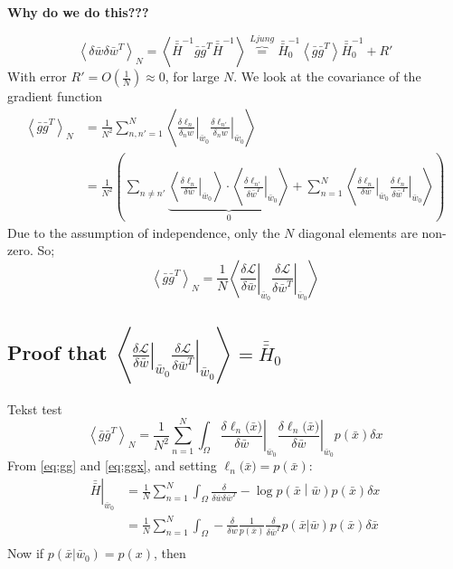 \textbf{Why do we do this???}

\begin{equation}
\left\langle \delta \bar{w} \delta \bar{w}^T \right\rangle_{N} = 
\left\langle \bar{\bar{H}}^{-1} \bar{g} \bar{g}^T \bar{\bar{H}}^{-1} \right\rangle
\overbrace{=}^{Ljung} \bar{\bar{H}}^{-1}_0 \left\langle \bar{g}\bar{g}^T \right\rangle \bar{\bar{H}}^{-1}_0 + R'
\end{equation}
With error $R' = O\left(\frac{1}{N}\right) \approx 0$, for large $N$. We look at the covariance of the gradient function
\begin{align}
\left\langle \bar{g} \bar{g}^T \right\rangle_N &= 
\frac{1}{N^2}\sum_{n, n' = 1}^N \left\langle \left. \frac{\delta \ell_n}{\delta_n \bar{w}} \right|_{\bar{w}_0} \left.\frac{\delta \ell_{n'}}{\delta_n \bar{w}} \right|_{\bar{w}_0} \right\rangle\\
 & = \frac{1}{N^2} \left(\sum_{n \neq n'} \underbrace{\left\langle \left. \frac{\delta \ell_n}{\delta \bar{w}} \right|_{\bar{w}_0} \right\rangle \cdot \left\langle \left. \frac{\delta \ell_{n'}}{\delta \bar{w}^T} \right|_{\bar{w}_0} \right\rangle }_0
 + \sum_{n =1 }^N \left\langle \left. \frac{\delta \ell_n}{\delta \bar{w}} \right|_{\bar{w}_0} \left. \frac{\delta \ell_n}{\delta \bar{w}^T} \right|_{\bar{w}_0}  \right\rangle \right)
\end{align}
Due to the assumption of independence, only the $N$ diagonal elements are non-zero. So;
\begin{equation}
\left\langle \bar{g} \bar{g}^T \right\rangle_N = \frac{1}{N} \left\langle \left. \frac{\delta \mathcal{L}}{\delta \bar{w}} \right|_{\bar{w}_0} \left. \frac{\delta \mathcal{L}}{\delta \bar{w}^T} \right|_{\bar{w}_0}  \right\rangle \label{eq:gg}
\end{equation}


\subsection{Proof that $\left\langle \left. \frac{\delta \mathcal{L}}{\delta \bar{w}} \right|_{\bar{w}_0} \left. \frac{\delta \mathcal{L}}{\delta \bar{w}^T} \right|_{\bar{w}_0}  \right\rangle = \bar{\bar{H}}_0$ }
Tekst test
\begin{equation}
\left\langle \bar{g} \bar{g}^T \right\rangle_N = 
\frac{1}{N^2} \sum_{n = 1}^N \int_{\Omega} 
\left. \frac{\delta \ell_n({\bar{x})}}{\delta \bar{w}} \right|_{\bar{w}_0}
\left. \frac{\delta \ell_n({\bar{x})}}{\delta \bar{w}} \right|_{\bar{w}_0}
p(\bar{x}) \delta x \label{eq:ggx}
\end{equation}
From \eqref{eq:gg} and \eqref{eq:ggx}, and setting $ \ell_n({\bar{x})} = p(\bar{x})$:
\begin{align}
\left.\bar{\bar{H}} \right|_{\bar{w}_0} &= 
\frac{1}{N} \sum_{n = 1}^N \int_{\Omega} 
\frac{\delta}{\delta \bar{w} \delta \bar{w}^T}
- \log p\left(\bar{x} \middle| \bar{w} \right) p(\bar{x}) \delta x\\
 &= \frac{1}{N} \sum_{n = 1}^N \int_{\Omega} - \frac{\delta}{\delta \bar{w}} \frac{1}{p\left(\bar{x}\right)}\frac{\delta }{\delta \bar{w}^T} p(\bar{x} | \bar{w}) p(\bar{x}) \delta \bar{x}\\
\end{align}
Now if $p(\bar{x}|\bar{w}_0) = p(x)$, then